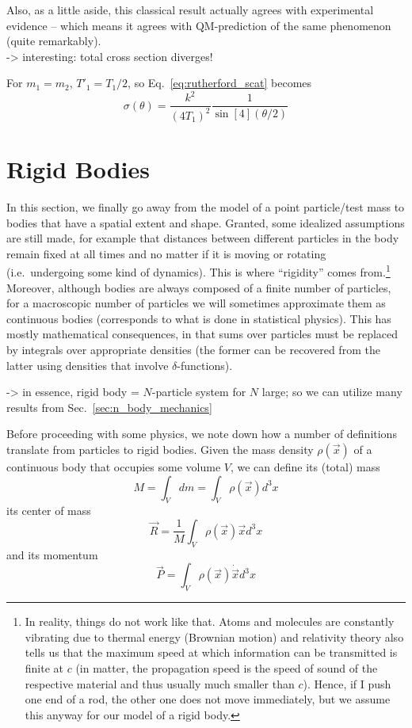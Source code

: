 \documentclass[../class_mech_main.tex]{subfiles}
\begin{document}
Also, as a little aside, this classical result actually agrees with experimental evidence -- which means it agrees with QM-prediction of the same phenomenon (quite remarkably).\\


-> interesting: total cross section diverges!


For $m_1 = m_2$, $T'_1 = T_1/2$, so Eq.~\eqref{eq:rutherford_scat} becomes
\begin{equation}
	\sigma(\theta) = \frac{k^2}{(4 T_1)^2} \frac{1}{\sin[4](\theta/2)}
\end{equation}



    \section{Rigid Bodies}
	\label{sec:rigid_body}
In this section, we finally go away from the model of a point particle/test mass to bodies that have a spatial extent and shape. Granted, some idealized assumptions are still made, for example that distances between different particles in the body remain fixed at all times and no matter if it is moving or rotating (i.e.~undergoing some kind of dynamics). This is where \enquote{rigidity} comes from.\footnote{In reality, things do not work like that. Atoms and molecules are constantly vibrating due to thermal energy (Brownian motion) and relativity theory also tells us that the maximum speed at which information can be transmitted is finite at $c$ (in matter, the propagation speed is the speed of sound of the respective material and thus usually much smaller than $c$). Hence, if I push one end of a rod, the other one does not move immediately, but we assume this anyway for our model of a rigid body.} Moreover, although bodies are always composed of a finite number of particles, for a macroscopic number of particles we will sometimes approximate them as continuous bodies (corresponds to what is done in statistical physics). This has mostly mathematical consequences, in that sums over particles must be replaced by integrals over appropriate densities (the former can be recovered from the latter using densities that involve $\delta$-functions).


-> in essence, rigid body = $N$-particle system for $N$ large; so we can utilize many results from Sec.~\ref{sec:n_body_mechanics}


Before proceeding with some physics, we note down how a number of definitions translate from particles to rigid bodies. Given the mass density $\rho(\vec{x})$ of a continuous body that occupies some volume $V$, we can define its (total) mass
\begin{equation}
	M = \int_V dm
	= \int_V \rho(\vec{x}) d^3x
\end{equation}
its center of mass
\begin{equation}
	\vec{R} = \frac{1}{M} \int_V \rho(\vec{x}) \vec{x} d^3x
\end{equation}
and its momentum
\begin{equation}
	\vec{P} = \int_V \rho(\vec{x}) \dot{\vec{x}} d^3x
\end{equation}
\end{document}
